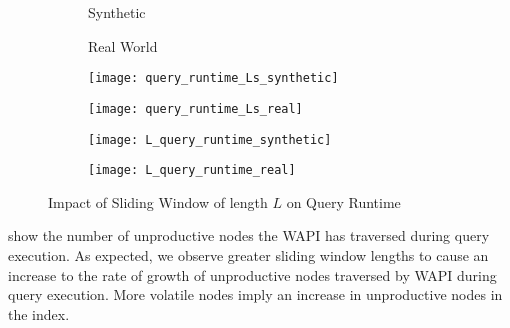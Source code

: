 \message{ !name(thesis.tex)}\documentclass[abstracton,12pt]{scrartcl}
\theoremstyle{definition}
\begin{document}
\begin{figure}
  \centering
  \begin{subfigure}{0.49\linewidth}
    \centering
    Synthetic
  \end{subfigure}
  \begin{subfigure}{0.49\linewidth}
    \centering
    Real World
  \end{subfigure}
  \begin{subfigure}{0.49\linewidth}
    \centering
    \texttt{[image: query\_runtime\_Ls\_synthetic]}
    \caption{}
    \label{fig:query_runtime_Ls_synthetic}
  \end{subfigure}
  \begin{subfigure}{0.49\linewidth}
    \centering
    \texttt{[image: query\_runtime\_Ls\_real]}
    \caption{}
    \label{fig:query_runtime_Ls_real}
  \end{subfigure}
  \begin{subfigure}{0.49\linewidth}
    \centering
    \texttt{[image: L\_query\_runtime\_synthetic]}
    \caption{}
    \label{fig:L_query_runtime_synthetic}
  \end{subfigure}
  \begin{subfigure}{0.49\linewidth}
    \centering
    \texttt{[image: L\_query\_runtime\_real]}
    \caption{}
    \label{fig:L_query_runtime_real}
  \end{subfigure}
  \caption{Impact of Sliding Window of length $L$ on Query Runtime}
\end{figure}


 show the
number of unproductive nodes the WAPI has traversed during query execution. As
expected, we observe greater sliding window lengths to cause an increase to the
rate of growth of unproductive nodes traversed by WAPI during query execution.
More volatile nodes imply an increase in unproductive nodes in the index.
\end{document}
